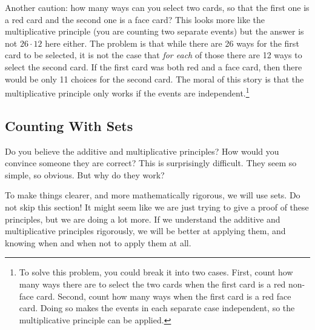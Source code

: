 \documentclass[10pt,]{memoir}
\theoremstyle{plain}
\theoremstyle{definition}
\theoremstyle{definition}
\theoremstyle{definition}
\numberwithin{equation}{chapter}
\begin{document}
Another caution: how many ways can you select two cards, so that the first one is a red card and the second one is a face card? This looks more like the multiplicative principle (you are counting two separate events) but the answer is not \(26 \cdot 12\) here either. The problem is that while there are 26 ways for the first card to be selected, it is not the case that \emph{for each} of those there are 12 ways to select the second card. If the first card was both red and a face card, then there would be only 11 choices for the second card. The moral of this story is that the multiplicative principle only works if the events are independent.\footnote{To solve this problem, you could break it into two cases. First, count how many ways there are to select the two cards when the first card is a red non-face card. Second, count how many ways when the first card is a red face card.  Doing so makes the events in each separate case independent, so the multiplicative principle can be applied.\label{fn-1}}
%
\typeout{************************************************}
\typeout{************************************************}
\subsection[Counting With Sets]{Counting With Sets}\label{subsec_countingWithSets}

Do you believe the additive and multiplicative principles? How would you convince someone they are correct? This is surprisingly difficult. They seem so simple, so obvious. But why do they work?
%
\par

To make things clearer, and more mathematically rigorous, we will use sets. Do not skip this section! It might seem like we are just trying to give a proof of these principles, but we are doing a lot more. If we understand the additive and multiplicative principles rigorously, we will be better at applying them, and knowing when and when not to apply them at all.
%
\par
\end{document}
